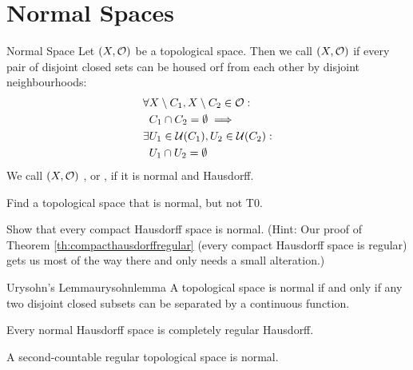 \clearpage
\section{Normal Spaces}
\begin{importantdefinition}{Normal Space}{}
	Let $(X, \mathcal{O})$ be a topological space. Then we call $(X,\mathcal{O})$  if every pair of disjoint closed sets can be housed orf from each other by disjoint neighbourhoods:
	\begin{align*}
		\forall &X \setminus C_1, X \setminus C_2 \in \mathcal{O}:\\
		&C_1 \cap C_2 = \emptyset \implies\\
		\exists &U_1 \in \mathcal{U}(C_1), U_2 \in \mathcal{U}(C_2):\\
		&U_1 \cap U_2 = \emptyset
	\end{align*} We call $(X, \mathcal{O})$
	, or , if it is normal and Hausdorff.
\end{importantdefinition}	
\begin{exercise}
	Find a topological space that is normal, but not T0.
\end{exercise}
\begin{exercise}
	\label{th:compacthausdorffnormal}
	Show that every compact Hausdorff space is normal. (Hint: Our proof of Theorem \ref{th:compacthausdorffregular} (every compact Hausdorff space is regular) gets us most of the way there and only needs a small alteration.)
\end{exercise}
\begin{importantlemma}{Urysohn's Lemma}{urysohnlemma}
	A topological space is normal if and only if any two disjoint closed subsets can be separated by a continuous function.	
\end{importantlemma}
\begin{corollary}
	Every normal Hausdorff space is completely regular Hausdorff.
\end{corollary}
\begin{theorem}
	\label{th:secondcountableregular}
	A second-countable regular topological space is normal.
\end{theorem}
